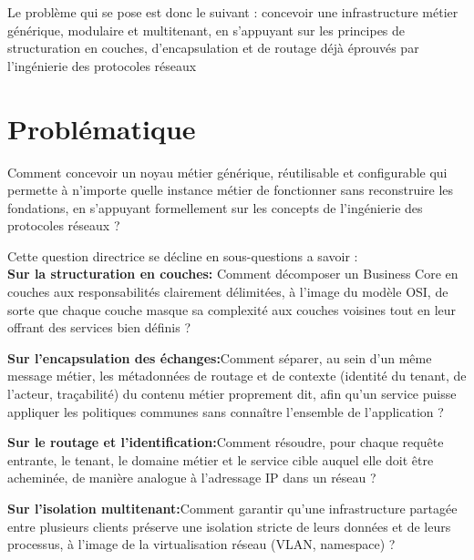 Le problème qui se pose est donc le suivant : concevoir une infrastructure métier générique, modulaire et multitenant, en s'appuyant sur les principes de structuration en couches, d'encapsulation et de routage déjà éprouvés par l'ingénierie des protocoles réseaux

\section{Problématique}

\begin{question}
Comment concevoir un noyau métier générique, réutilisable et configurable qui permette à
n'importe quelle instance métier de fonctionner sans reconstruire les fondations, en
s'appuyant formellement sur les concepts de l'ingénierie des protocoles réseaux ?
\end{question}

Cette question directrice se décline en sous-questions a savoir : \\

    \textbf{Sur la structuration en couches:} Comment décomposer un Business Core en couches aux responsabilités clairement délimitées, à l'image du modèle OSI, de sorte que chaque couche masque sa complexité aux couches voisines tout en leur offrant des services bien définis ?

    \textbf{Sur l'encapsulation des échanges:}Comment séparer, au sein d'un même message métier, les métadonnées de routage et de contexte (identité du tenant, de l'acteur, traçabilité) du contenu métier proprement dit, afin qu'un service puisse appliquer les politiques communes sans connaître l'ensemble de l'application ?

    \textbf{Sur le routage et l'identification:}Comment résoudre, pour chaque requête entrante, le tenant, le domaine métier et le service cible auquel elle doit être acheminée, de manière analogue à l'adressage IP dans un réseau ?

    \textbf{Sur l'isolation multitenant:}Comment garantir qu'une infrastructure partagée entre plusieurs clients préserve une isolation stricte de leurs données et de leurs processus, à l'image de la virtualisation réseau (VLAN, namespace) ?

